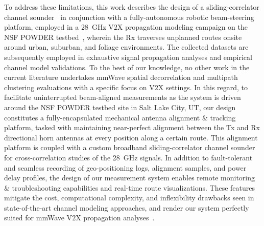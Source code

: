 \documentclass[10pt, twocolumn]{IEEEtran}
\begin{document}
To address these limitations, this work describes the design of a sliding-correlator channel sounder~\cite{Sounder} in conjunction with a fully-autonomous robotic beam-steering platform, employed in a \SI{28}{\giga\hertz} V$2$X propagation modeling campaign on the NSF POWDER testbed~\cite{POWDER, POWDER_RF}, wherein the Rx traverses unplanned routes onsite around urban, suburban, and foliage environments. The collected datasets are subsequently employed in exhaustive signal propagation analyses and empirical channel model validations. To the best of our knowledge, no other work in the current literature undertakes mmWave spatial decorrelation and multipath clustering evaluations with a specific focus on V$2$X settings. In this regard, to facilitate uninterrupted beam-aligned measurements as the system is driven around the NSF POWDER testbed site in Salt Lake City, UT, our design constitutes a fully-encapsulated mechanical antenna alignment \& tracking platform, tasked with maintaining near-perfect alignment between the Tx and Rx directional horn antennas at every position along a certain route. This alignment platform is coupled with a custom broadband sliding-correlator channel sounder for cross-correlation studies of the \SI{28}{\giga\hertz} signals. In addition to fault-tolerant and seamless recording of geo-positioning logs, alignment samples, and power delay profiles, the design of our measurement system enables remote monitoring \& troubleshooting capabilities and real-time route visualizations. These features mitigate the cost, computational complexity, and inflexibility drawbacks seen in state-of-the-art channel modeling approaches, and render our system perfectly suited for mmWave V$2$X propagation analyses~\cite{SPAVE_ICC}.
\end{document}
